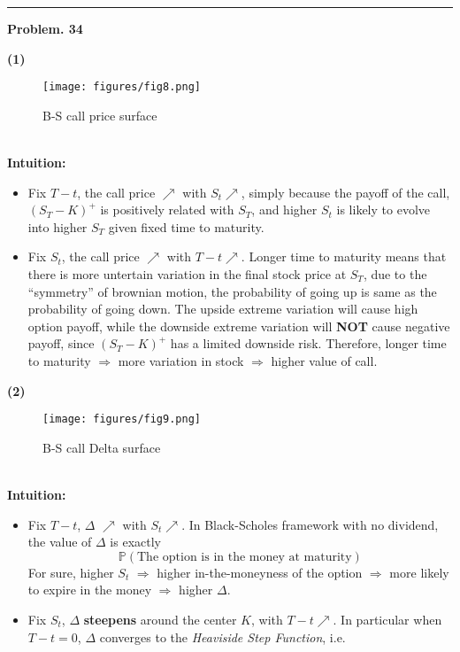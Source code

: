 \documentclass[10 pt]{hwtemplate} %
\begin{document}
\noindent\rule{16cm}{0.4pt}
\textbf{Problem. 34} 
\begin{solution} 
\textbf{(1)} ~\\
\begin{figure}[H]
  \centering
  \captionsetup{justification=centering}
  \caption{B-S call price surface}
  \texttt{[image: figures/fig8.png]}
\end{figure}
~\\
\textbf{Intuition:}
\begin{itemize}
  \item Fix $T-t$, the call price $\nearrow$ with $S_t \nearrow$, simply because the payoff of the call, $(S_T-K)^+$ is positively related with $S_T$, and higher $S_t$ is likely to evolve into higher $S_T$ given fixed time to maturity.
  \item Fix $S_t$, the call price $\nearrow$ with $T-t \nearrow$. Longer time to maturity means that there is more untertain variation in the final stock price at $S_T$, due to the ``symmetry'' of brownian motion, the probability of going up is same as the probability of going down. The upside extreme variation will cause high option payoff, while the downside extreme variation will \textbf{NOT} cause negative payoff, since $(S_T- K)^+$ has a limited downside risk. Therefore, longer time to maturity $\Rightarrow$ more variation in stock $\Rightarrow$ higher value of call.
\end{itemize}
\textbf{(2)} 
\begin{figure}[H]
  \centering
  \captionsetup{justification=centering}
  \caption{B-S call Delta surface}
  \texttt{[image: figures/fig9.png]}
\end{figure}
~\\
\textbf{Intuition:}
\begin{itemize}
  \item Fix $T-t$, $\Delta$ $\nearrow$ with $S_t \nearrow$. In Black-Scholes framework with no dividend, the value of $\Delta$ is exactly
  $$
  \mathbb{P}\left(\text{The option is in the money at maturity}\right)
  $$ 
  For sure, higher $S_t$ $\Rightarrow$ higher in-the-moneyness of the option $\Rightarrow$ more likely to expire in the money $\Rightarrow$ higher $\Delta$.
  \item Fix $S_t$, $\Delta$ \textbf{steepens} around the center $K$, with $T-t \nearrow$. In particular when $T-t=0$, $\Delta$ converges to the \textit{Heaviside Step Function}, i.e.

\end{itemize}
\end{solution}
\end{document}
